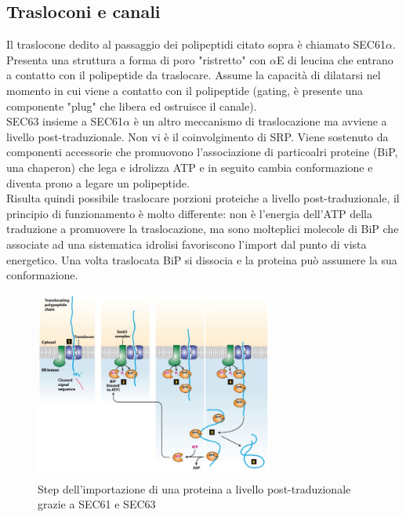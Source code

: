    \subsection{Trasloconi e canali}
        Il traslocone dedito al passaggio dei polipeptidi citato sopra è chiamato SEC61$\alpha$. Presenta una struttura a forma di poro "ristretto" con $\alpha$E di leucina che entrano a contatto con il polipeptide da traslocare.
        Assume la capacità di dilatarsi nel momento in cui viene a contatto con il polipeptide (gating, è presente una componente "plug" che libera ed ostruisce il canale). \\
        SEC63 insieme a SEC61$\alpha$ è un altro meccanismo di traslocazione ma avviene a livello post-traduzionale. Non vi è il coinvolgimento di SRP.
        Viene sostenuto da componenti accessorie che promuovono l'associazione di particoalri proteine (BiP, una chaperon) che lega e idrolizza ATP e in seguito cambia conformazione e diventa prono a legare un polipeptide.  \\
        Risulta quindi possibile traslocare porzioni proteiche a livello post-traduzionale, il principio di funzionamento è molto differente: non è l'energia dell'ATP della traduzione a promuovere la traslocazione, ma sono molteplici molecole di BiP che associate ad una sistematica idrolisi favoriscono l'import dal punto di vista energetico. 
        Una volta traslocata BiP si dissocia e la proteina può assumere la sua conformazione.
        \begin{figure}[h]
            \centering
            \includegraphics[width=0.7\textwidth]{images/importazioneSEC63-61.JPG}
            \caption{\small Step dell'importazione di una proteina a livello post-traduzionale grazie a SEC61 e SEC63}
            \label{fig:mesh1}
        \end{figure}
        
